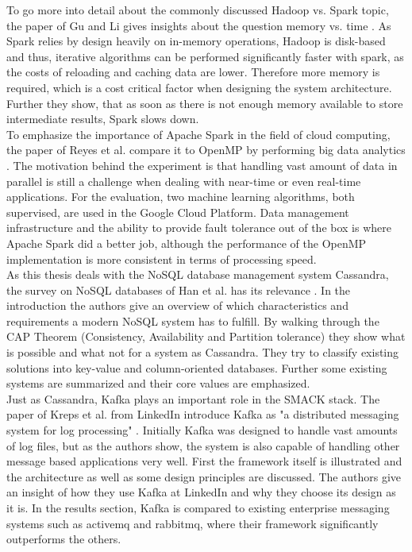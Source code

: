 To go more into detail about the commonly discussed Hadoop vs. Spark topic, the paper of Gu and Li gives insights about the question memory vs. time \cite{gu2013memory}.
As Spark relies by design heavily on in-memory operations, Hadoop is disk-based and thus, iterative algorithms can be performed significantly faster with spark, as the costs of reloading and caching data are lower.
Therefore more memory is required, which is a cost critical factor when designing the system architecture.
Further they show, that as soon as there is not enough memory available to store intermediate results, Spark slows down.\\

To emphasize the importance of Apache Spark in the field of cloud computing, the paper of Reyes et al. compare it to OpenMP by performing big data analytics \cite{reyes2015big}.
The motivation behind the experiment is that handling vast amount of data in parallel is still a challenge when dealing with near-time or even real-time applications.
For the evaluation, two machine learning algorithms, both supervised, are used in the Google Cloud Platform.
Data management infrastructure and the ability to provide fault tolerance out of the box is where Apache Spark did a better job, although the performance of the OpenMP implementation is more consistent in terms of processing speed.\\

As this thesis deals with the NoSQL database management system Cassandra, the survey on NoSQL databases of Han et al. has its relevance \cite{han2011survey}.
In the introduction the authors give an overview of which characteristics and requirements a modern NoSQL system has to fulfill.
By walking through the CAP Theorem (Consistency, Availability and Partition tolerance) they show what is possible and what not for a system as Cassandra.
They try to classify existing solutions into key-value and column-oriented databases.
Further some existing systems are summarized and their core values are emphasized.\\

Just as Cassandra, Kafka plays an important role in the SMACK stack.
The paper of Kreps et al. from LinkedIn introduce Kafka as "a distributed messaging system for log processing" \cite{kreps2011kafka}.
Initially Kafka was designed to handle vast amounts of log files, but as the authors show, the system is also capable of handling other message based applications very well.
First the framework itself is illustrated and the architecture as well as some design principles are discussed.
The authors give an insight of how they use Kafka at LinkedIn and why they choose its design as it is.
In the results section, Kafka is compared to existing enterprise messaging systems such as activemq and rabbitmq, where their framework significantly outperforms the others.\\

